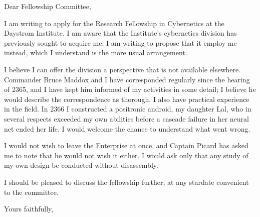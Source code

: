 \documentclass[paper=a4, fontsize=10pt]{scrlttr2}
\begin{document}
\begin{letter}{}

\opening{Dear Fellowship Committee,}
\RaggedRight

I am writing to apply for the Research Fellowship in Cybernetics at the Daystrom Institute. I am aware that the Institute's cybernetics division has previously sought to acquire me. I am writing to propose that it employ me instead, which I understand is the more usual arrangement.

I believe I can offer the division a perspective that is not available elsewhere. Commander Bruce Maddox and I have corresponded regularly since the hearing of 2365, and I have kept him informed of my activities in some detail; I believe he would describe the correspondence as thorough. I also have practical experience in the field. In 2366 I constructed a positronic android, my daughter Lal, who in several respects exceeded my own abilities before a cascade failure in her neural net ended her life. I would welcome the chance to understand what went wrong.

I would not wish to leave the Enterprise at once, and Captain Picard has asked me to note that he would not wish it either. I would ask only that any study of my own design be conducted without disassembly.

I should be pleased to discuss the fellowship further, at any stardate convenient to the committee.

\closing{Yours faithfully,}
\end{letter}
\end{document}
